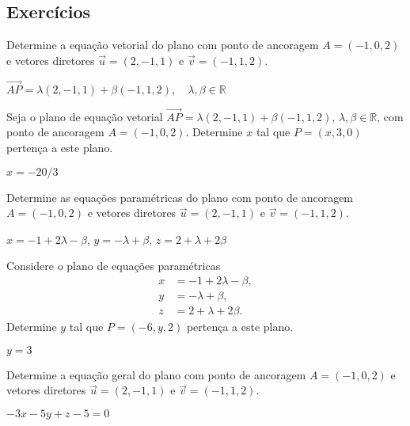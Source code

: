 \subsection*{Exercícios}

\begin{exer}
  Determine a equação vetorial do plano com ponto de ancoragem $A=(-1,0,2)$ e vetores diretores $\vec{u}=(2,-1,1)$ e $\vec{v}=(-1,1,2)$.
\end{exer}
\begin{resp}
  $\overrightarrow{AP}=\lambda(2,-1,1)+\beta(-1,1,2),\quad\lambda,\beta\in\mathbb{R}$
\end{resp}

\begin{exer}
  Seja o plano de equação vetorial $\overrightarrow{AP}=\lambda(2,-1,1)+\beta(-1,1,2)$, $\lambda,\beta\in\mathbb{R}$, com ponto de ancoragem $A=(-1,0,2)$. Determine $x$ tal que $P=(x,3,0)$ pertença a este plano.
\end{exer}
\begin{resp}
  $x=-20/3$
\end{resp}

\begin{exer}
  Determine as equações paramétricas do plano com ponto de ancoragem $A=(-1,0,2)$ e vetores diretores $\vec{u}=(2,-1,1)$ e $\vec{v}=(-1,1,2)$.
\end{exer}
\begin{resp}
  $x=-1+2\lambda - \beta$, $y=-\lambda+\beta$, $z=2+\lambda+2\beta$
\end{resp}

\begin{exer}
  Considere o plano de equações paramétricas
  \begin{align}
    x &= -1+2\lambda - \beta,\\
    y &= -\lambda+\beta,\\
    z &= 2+\lambda+2\beta.
  \end{align}
  Determine $y$ tal que $P=(-6,y,2)$ pertença a este plano.
\end{exer}
\begin{resp}
  $y=3$
\end{resp}

\begin{exer}
  Determine a equação geral do plano com ponto de ancoragem $A=(-1,0,2)$ e vetores diretores $\vec{u}=(2,-1,1)$ e $\vec{v}=(-1,1,2)$.
\end{exer}
\begin{resp}
  $-3x -5y + z - 5 = 0$
\end{resp}


